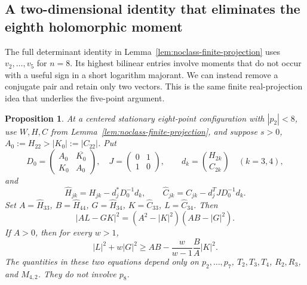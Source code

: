 \documentclass[11pt]{article}
\newtheorem{proposition}[theorem]{Proposition}
\theoremstyle{remark}
\numberwithin{equation}{section}
\begin{document}
\subsection{A two-dimensional identity that eliminates the eighth holomorphic moment}
The full determinant identity in Lemma~\ref{lem:noclass-finite-projection}
uses $v_2,\ldots,v_5$ for $n=8$. Its highest bilinear entries involve
moments that do not occur with a useful sign in a short logarithm
majorant. We can instead remove a conjugate pair and retain only two
vectors. This is the same finite real-projection idea that underlies
the five-point argument.

\begin{proposition}\label{prop:noorigin-oct7-eight-twoD}
At a centered stationary eight-point configuration with $|p_2|<8$,
use $W,H,C$ from Lemma~\ref{lem:noclass-finite-projection}, and suppose
$s>0$, $A_0:=H_{22}>|K_0|:=|C_{22}|$. Put
\[
 D_0=\begin{pmatrix}A_0&\overline{K_0}\\K_0&A_0\end{pmatrix},
 \quad J=\begin{pmatrix}0&1\\1&0\end{pmatrix},\qquad
 d_k=\binom{H_{2k}}{C_{2k}}\quad(k=3,4),
\]
and
\[
 \widehat H_{jk}=H_{jk}-d_j^*D_0^{-1}d_k,
 \qquad
 \widehat C_{jk}=C_{jk}-d_j^TJD_0^{-1}d_k.
\]
Set $A=\widehat H_{33}$, $B=\widehat H_{44}$,
$G=\widehat H_{34}$, $K=\widehat C_{33}$,
$L=\widehat C_{34}$. Then
\begin{equation}\label{eq:noorigin-oct7-eight-twoD}
 |AL-GK|^2=(A^2-|K|^2)(AB-|G|^2).
\end{equation}
If $A>0$, then for every $w>1$,
\begin{equation}\label{eq:noorigin-oct7-eight-weighted}
 |L|^2+w|G|^2\ge AB-\frac{w}{w-1}\frac BA|K|^2.
\end{equation}
The quantities in these two equations depend only on
$p_2,\ldots,p_7$, $T_2,T_3,T_4$, $R_2,R_3$, and $M_{4,2}$.
They do not involve $p_8$.
\end{proposition}
\end{document}
